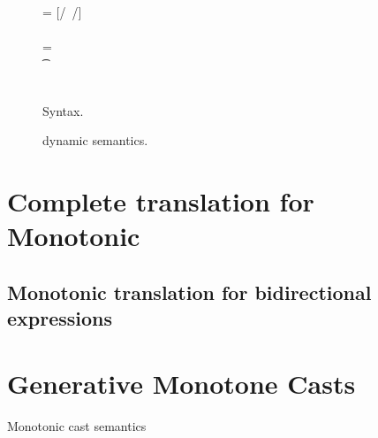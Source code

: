 \documentclass[sigconf]{acmart}
\begin{document}
\begin{figure*}[!h]
\begin{minipage}{0.45\textwidth}
\begin{tabbing}
\> \> \> \> \> \> \> \StrSub {\emptyset} \tp
\\
 \K\HS {\DynCall\a\m\ap}\> \s        \>\Red\>    \K \> \ep \> \s \>  \WHERE\> \ep = {[\a/\this~{\ap/\x}]\e}\HS \\ \> \> \> \> \> \> \> \Mdef\m\x\any\any\e \In \App\K\C \\ \> \> \> \> \> \> \> \App\s\a=\obj{} 
\\
 \K\HS {\MonCast \t\a} \> \s         \>\Red\>   \Kp \> \ap \> \sp \> \WHERE\> \moncast \a\t\s\K \Kp\ap\sp    
\\
\K \HS \EM{\EE[\e]} \> \s            \>\Red\>   \Kp \> \EM{\EE[\ep]} \> \sp \> \WHERE \> \K~\e~\s \Red~\Kp~\ep~\sp
\end{tabbing}
\end{minipage}
\vspace{2mm}

\noindent\hrulefill\caption{\kafka Syntax.}\label{syn}
\end{figure*}


\begin{figure}[!h]

\medskip
\hrulefill
\caption{\kafka dynamic semantics.}\label{fig:semantics}
\end{figure}

\section{Complete translation for Monotonic}



\subsection{Monotonic translation for bidirectional expressions}


\section{Generative Monotone Casts}

\begin{mathpar}
\end{mathpar}
{Monotonic cast semantics}
\end{document}
